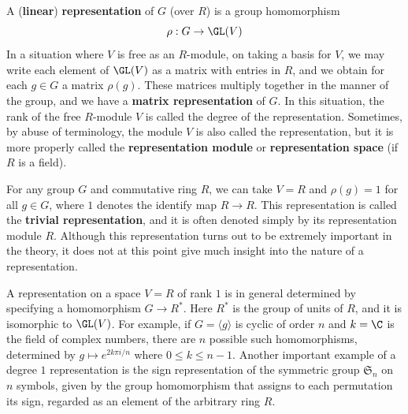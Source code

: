 A (\textbf{linear}) \textbf{representation} of $G$ (over $R$) is a group homomorphism
\[\rho:G\to\GL(V)\]
In a situation where $V$ is free as an $R$-module, on taking a basis for $V$, we may write each element of $\GL(V)$ as a matrix with entries in $R$, and we obtain for each $g\in G$ a matrix $\rho(g)$. These matrices multiply together in the manner of the group, and we have a \textbf{matrix representation} of $G$. In this situation, the rank of the free $R$-module $V$ is called the degree of the representation. Sometimes, by abuse of terminology, the module $V$ is also called the representation, but it is more properly called the \textbf{representation module} or \textbf{representation space} (if $R$ is a field).
\begin{example}
For any group $G$ and commutative ring $R$, we can take $V=R$ and $\rho(g)=1$ for all $g\in G$, where $1$ denotes the identify map $R\to R$. This representation is called the \textbf{trivial representation}, and it is often denoted simply by its representation module $R$. Although this representation turns out to be extremely important in the theory, it does not at this point give much insight into the nature of a representation.
\end{example}
\begin{example}
A representation on a space $V=R$ of rank $1$ is in general determined by specifying a homomorphism $G\to R^*$. Here $R^*$ is the group of units of $R$, and it is isomorphic to $\GL(V)$. For example, if $G=\langle g\rangle$ is cyclic of order $n$ and $k=\C$ is the field of complex numbers, there are $n$ possible such homomorphisms, determined by $g\mapsto e^{2k\pi i/n}$ where $0\leq k\leq n-1$. Another important example of a degree $1$ representation is the sign representation of the symmetric group $\mathfrak{S}_n$ on $n$ symbols, given by the group homomorphism that assigns to each permutation its sign, regarded as an element of the arbitrary ring $R$.
\end{example}
